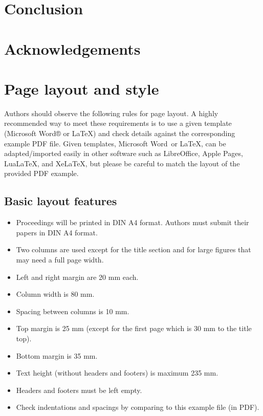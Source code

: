 \documentclass[a4paper]{article}
\begin{document}
\section{Conclusion}

\section{Acknowledgements}

\section{Page layout and style}

Authors should observe the following rules for page layout. A highly recommended way to meet these requirements is to use a given template (Microsoft Word® or LaTeX) and check details against the corresponding example PDF file. Given templates, Microsoft Word\textregistered\ or \LaTeX, can be adapted/imported easily in other software such as LibreOffice, Apple Pages, Lua\LaTeX, and Xe\LaTeX, but please be careful to match the layout of the provided PDF example.

\subsection{Basic layout features}

\begin{itemize}
\item Proceedings will be printed in DIN A4 format. Authors must submit their papers in DIN A4 format.
\item Two columns are used except for the title section and for large figures that may need a full page width.
\item Left and right margin are 20 mm each. 
\item Column width is 80 mm. 
\item Spacing between columns is 10 mm.
\item Top margin is 25 mm (except for the first page which is 30 mm to the title top).
\item Bottom margin is 35 mm.
\item Text height (without headers and footers) is maximum 235 mm.
\item Headers and footers must be left empty.
\item Check indentations and spacings by comparing to this example file (in PDF).
\end{itemize}
\end{document}
